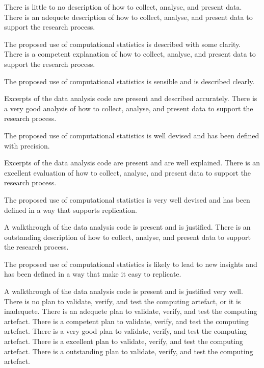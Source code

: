 \begin{markingrubric}
        \grade\fail 	There is little to no description of how to collect, analyse, and present data.
        \grade 		There is an adequete description of how to collect, analyse, and present data to support the research process.
         \par		The proposed use of computational statistics is described with some clarity.        
        \grade 		There is a competent explanation of how to collect, analyse, and present data to support the research process.
         \par		The proposed use of computational statistics is sensible and is described clearly.         
        \par		Excerpts of the data analysis code are present and described accurately.                 
        \grade 		There is a very good analysis of how to collect, analyse, and present data to support the research process.
         \par		The proposed use of computational statistics is well devised and has been defined with precision.                  
        \par		Excerpts of the data analysis code are present and are well explained.   
        \grade 		There is an excellent evaluation of how to collect, analyse, and present data to support the research process.
         \par		The proposed use of computational statistics is very well devised and has been defined in a way that supports replication.      
        \par		A walkthrough of the data analysis code is present and is justified.   
        \grade 		There is an outstanding description of how to collect, analyse, and present data to support the research process.
         \par		The proposed use of computational statistics is likely to lead to new insights and has been defined in a way that make it easy to replicate.        
        \par		A walkthrough of the data analysis code is present and is justified very well. 
%
        \grade\fail 	There is no plan to validate, verify, and test the computing artefact, or it is inadequete.
        \grade 		There is an adequete plan to validate, verify, and test the computing artefact.
        \grade 		There is a competent plan to validate, verify, and test the computing artefact.
        \grade 		There is a very good plan to validate, verify, and test the computing artefact.
        \grade 		There is a excellent plan to validate, verify, and test the computing artefact.
        \grade 		There is a outstanding plan to validate, verify, and test the computing artefact.    
\end{markingrubric}

